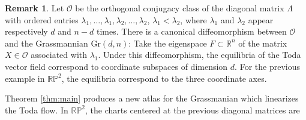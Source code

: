 \documentclass[reqno]{amsart}
\newcommand{\RR}{{\mathbb{R}}}
\newcommand{\cO}{\mathcal{O}}
\theoremstyle{definition} %
\newtheorem{remark}{Remark}
\begin{document}
\begin{remark} Let $\cO$ be the orthogonal conjugacy class of the diagonal matrix $\Lambda$ with ordered entries $\lambda_1, \dots, \lambda_1, \lambda_{2}, \dots, \lambda_2$, $\lambda_1 < \lambda_2$, where $\lambda_1$ and $\lambda_2$ appear respectively $d$ and $n-d$ times. There is a canonical diffeomorphism between $\cO$ and the Grassmannian $\mathrm{Gr}(d,n)$: Take the eigenspace $F \subset \RR^n$ of the matrix $X \in \cO$ associated with $\lambda_1$. Under this diffeomorphism, the equilibria of the Toda vector field correspond to coordinate subspaces of dimension $d$. 
For the previous example in 	$\mathbb{RP}^2$, the equilibria correspond to the three coordinate axes.



Theorem \ref{thm:main} produces a new atlas for the Grassmanian which linearizes the Toda flow. In $\mathbb{RP}^2$, the charts centered at the previous diagonal matrices are


%
%
%



\end{remark}
\end{document}
